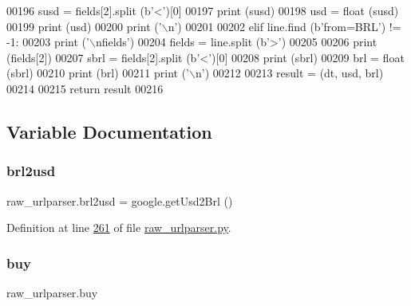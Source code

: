 \begin{DoxyCode}
00196             susd = fields[2].split (b\textcolor{stringliteral}{'<'})[0]
00197             \textcolor{keywordflow}{print} (susd)
00198             usd = float (susd)
00199             \textcolor{keywordflow}{print} (usd)
00200             \textcolor{keywordflow}{print} (\textcolor{stringliteral}{'\(\backslash\)n'})
00201         
00202         \textcolor{keywordflow}{elif} line.find (b\textcolor{stringliteral}{'from=BRL'}) != -1:
00203             \textcolor{keywordflow}{print} (\textcolor{stringliteral}{'\(\backslash\)nfields'})
00204             fields = line.split (b\textcolor{stringliteral}{'>'})
00205             
00206             \textcolor{keywordflow}{print} (fields[2])
00207             sbrl = fields[2].split (b\textcolor{stringliteral}{'<'})[0]
00208             \textcolor{keywordflow}{print} (sbrl)
00209             brl = float (sbrl)
00210             \textcolor{keywordflow}{print} (brl)
00211             \textcolor{keywordflow}{print} (\textcolor{stringliteral}{'\(\backslash\)n'})
00212             
00213     result = (dt, usd, brl)
00214     
00215     \textcolor{keywordflow}{return} result
00216 
\end{DoxyCode}


\subsection{Variable Documentation}
\mbox{\label{namespaceraw__urlparser_ae7e1c02df9ab0102e017e31885aa6431}} 
\subsubsection{\texorpdfstring{brl2usd}{brl2usd}}
{\footnotesize\ttfamily raw\+\_\+urlparser.\+brl2usd = google.\+get\+Usd2\+Brl ()}



Definition at line \hyperlink{raw__urlparser_8py_source_l00261}{261} of file \hyperlink{raw__urlparser_8py_source}{raw\+\_\+urlparser.\+py}.

\mbox{\label{namespaceraw__urlparser_a2b9c66c8d5157cd95ecb738719c8a873}} 
\subsubsection{\texorpdfstring{buy}{buy}}
{\footnotesize\ttfamily raw\+\_\+urlparser.\+buy}



